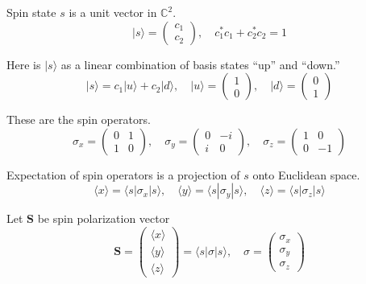 \documentclass[12pt]{article}
\begin{document}
Spin state $s$ is a unit vector in $\mathbb{C}^2$.
\begin{equation*}
|s\rangle=\begin{pmatrix}c_1\\c_2\end{pmatrix},
\quad
c_1^*c_1+c_2^*c_2=1
\end{equation*}

Here is $|s\rangle$ as a linear combination of basis states ``up'' and ``down.''
\begin{equation*}
|s\rangle=c_1|u\rangle+c_2|d\rangle,
\quad
|u\rangle=\begin{pmatrix}1\\0\end{pmatrix},
\quad
|d\rangle=\begin{pmatrix}0\\1\end{pmatrix}
\end{equation*}

These are the spin operators.
\begin{equation*}
\sigma_x=\begin{pmatrix}0&1\\1&0\end{pmatrix},
\quad
\sigma_y=\begin{pmatrix}0&-i\\i&0\end{pmatrix},
\quad
\sigma_z=\begin{pmatrix}1&0\\0&-1\end{pmatrix}
\end{equation*}

Expectation of spin operators is a projection of $s$ onto Euclidean space.
\begin{equation*}
\langle x\rangle=\langle s|\sigma_x|s\rangle,
\quad
\langle y\rangle=\langle s|\sigma_y|s\rangle,
\quad
\langle z\rangle=\langle s|\sigma_z|s\rangle
\end{equation*}

Let $\mathbf S$ be spin polarization vector
\begin{equation*}
\mathbf S=\begin{pmatrix}\langle x\rangle\\\langle y\rangle\\\langle z\rangle\end{pmatrix}
=\langle s|\sigma|s\rangle,
\quad
\sigma=\begin{pmatrix}\sigma_x\\\sigma_y\\\sigma_z\end{pmatrix}
\end{equation*}
\end{document}

